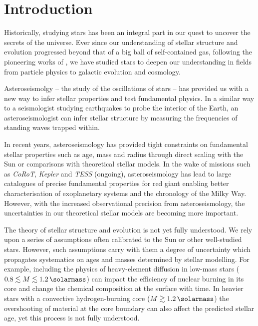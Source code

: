 \chapter{Introduction}

Historically, studying stars has been an integral part in our quest to uncover the secrets of the universe. Ever since our understanding of stellar structure and evolution progressed beyond that of a big ball of self-contained gas, following the pioneering works of \citet{Eddington1926}, we have studied stars to deepen our understanding in fields from particle physics to galactic evolution and cosmology.

Asteroseismolgy -- the study of the oscillations of stars -- has provided us with a new way to infer stellar properties and test fundamental physics. In a similar way to a seismologist studying earthquakes to probe the interior of the Earth, an asteroseismologist can infer stellar structure by measuring the frequencies of standing waves trapped within.

In recent years, asteroseismology has provided tight constraints on fundamental stellar properties such as age, mass and radius through direct scaling with the Sun or comparisons with theoretical stellar models. In the wake of missions such as \emph{CoRoT}, \emph{Kepler} and \emph{TESS} (ongoing), asteroseismology has lead to large catalogues of precise fundamental properties for red giant \citep[e.g.][]{Pinsonneault.Elsworth.ea2014, Serenelli.Johnson.ea2017} enabling better characterisation of exoplanetary systems and the chronology of the Milky Way. However, with the increased observational precision from asteroseismology, the uncertainties in our theoretical stellar models are becoming more important.

The theory of stellar structure and evolution is not yet fully understood. We rely upon a series of assumptions often calibrated to the Sun or other well-studied stars. However, such assumptions carry with them a degree of uncertainty which propagates systematics on ages and masses determined by stellar modelling. For example, including the physics of heavy-element diffusion in low-mass stars ($0.8 \lesssim M \lesssim \SI{1.2}{\solarmass}$) can impact the efficiency of nuclear burning in its core and change the chemical composition at the surface with time. In heavier stars with a convective hydrogen-burning core ($M \gtrsim \SI{1.2}{\solarmass}$) the overshooting of material at the core boundary can also affect the predicted stellar age, yet this process is not fully understood. 

